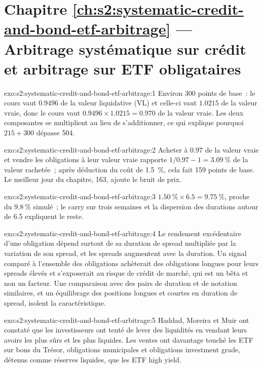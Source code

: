 \section*{Chapitre \ref{ch:s2:systematic-credit-and-bond-etf-arbitrage} --- Arbitrage systématique sur crédit et arbitrage sur ETF obligataires}

\begin{solution}{exo:s2:systematic-credit-and-bond-etf-arbitrage:1}
Environ 300 points de base~: le cours vaut $0.9496$ de la valeur liquidative (VL) et celle-ci vaut $1.0215$ de la valeur vraie, donc le cours vaut $0.9496 \times 1.0215 = 0.970$ de la
valeur vraie. Les deux composantes se multiplient au lieu de s'additionner, ce qui explique pourquoi $215 + 300$ dépasse 504.
\end{solution}

\begin{solution}{exo:s2:systematic-credit-and-bond-etf-arbitrage:2}
Acheter à $0.97$ de la valeur vraie et vendre les obligations à leur valeur vraie rapporte $1/0.97 - 1 = 3.09~\%$ de la valeur rachetée~; après déduction du coût de 1.5~\%, cela fait
159 points de base. Le meilleur jour du chapitre, 163, ajoute le bruit de prix.
\end{solution}

\begin{solution}{exo:s2:systematic-credit-and-bond-etf-arbitrage:3}
$1.50~\% \times 6.5 = 9.75~\%$, proche du $9.8~\%$ simulé~; le carry sur trois semaines et la dispersion des durations autour de 6.5 expliquent le reste.
\end{solution}

\begin{solution}{exo:s2:systematic-credit-and-bond-etf-arbitrage:4}
Le rendement excédentaire d'une obligation dépend surtout de sa duration de spread multipliée par la variation de son spread, et les spreads augmentent avec la duration. Un signal comparé à l'ensemble des obligations
achèterait des obligations longues pour leurs spreads élevés et s'exposerait au risque de crédit de marché, qui est un bêta et non un facteur. Une comparaison avec des pairs de
duration et de notation similaires, et un équilibrage des positions longues et courtes en duration de spread, isolent la caractéristique.
\end{solution}

\begin{solution}{exo:s2:systematic-credit-and-bond-etf-arbitrage:5}
Haddad, Moreira et Muir ont constaté que les investisseurs ont tenté de lever des liquidités en vendant leurs avoirs les plus sûrs et les plus liquides. Les ventes
ont davantage touché les ETF sur bons du Trésor, obligations municipales et obligations investment grade, détenus comme réserves liquides, que les ETF high yield.
\end{solution}

